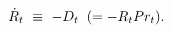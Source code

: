 \begin{equation}
\begin{split}
     \dot{R}_{t} \
     \equiv \ -D_{t} \hspace{0.2cm} (= -R_{t} Pr_{t}).
\end{split}
\label{Equation:DCDP-Model_Reserve}
\end{equation}